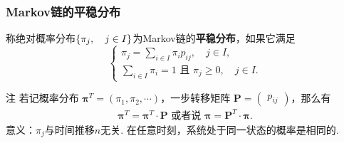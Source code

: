 \begin{frame}
    \frametitle{Markov链的平稳分布}
    \begin{mydefinition}[Markov链的平稳分布]
        称绝对概率分布$\left\{\pi_j,\quad j\in I\right\}$为Markov链的\textbf{平稳分布}，如果它满足
            \begin{equation}
                \begin{cases}
                    \pi_j=\displaystyle\sum_{i\in I}\pi_ip_{ij},\quad j\in I,\\
                    \displaystyle\sum_{i\in I}\pi_i=1\text{ 且 }\pi_j\geqslant 0,\quad j\in I.
                \end{cases}
            \end{equation}            
    \end{mydefinition}
    \begin{block}{注}
        若记概率分布 $\bm\pi^T=(\pi_1,\pi_2,\cdots)$，一步转移矩阵 $\bm P=\begin{pmatrix}
            p_{ij}
        \end{pmatrix}$，那么有
            \begin{align}
                \bm\pi^T=\bm\pi^T\cdot\bm P\text{ 或者说 }
                \bm\pi=\bm P^T\cdot\bm\pi.
            \end{align}            
        意义：$\pi_j$与时间推移$n$无关. 在任意时刻，系统处于同一状态的概率是相同的.
    \end{block}
\end{frame}

